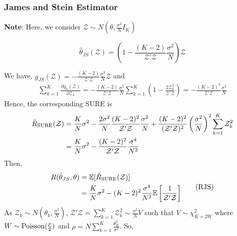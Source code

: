 \documentclass[11pt]{elegantbook}
\begin{document}
\subsubsection{James and Stein Estimator}
\textbf{Note}: Here, we consider $\mathcal{Z}\sim N(\theta,\frac{\sigma^2}{N}I_K)$
\begin{theorem}
    $$\hat{\theta}_{JS}(\mathcal{Z})=\left(1-\frac{(K-2)}{\mathcal{Z}'\mathcal{Z}}\frac{\sigma^2}{N}\right)\mathcal{Z}$$
\end{theorem}
We have, $g_{JS}(\mathcal{Z})=-\frac{(K-2)}{\mathcal{Z}'\mathcal{Z}}\frac{\sigma^2}{N}\mathcal{Z}$ and
\begin{equation}
    \begin{aligned}
        \sum_{k=1}^K \frac{\partial g_k(\mathcal{Z})}{\partial \mathcal{Z}_k}=-\frac{(K-2)}{\mathcal{Z}'\mathcal{Z}}\frac{\sigma^2}{N}\sum_{k=1}^K\left(1-\frac{2 \mathcal{Z}_k^2}{\mathcal{Z}'\mathcal{Z}}\right)=-\frac{(K-2)^2}{\mathcal{Z}'\mathcal{Z}}\frac{\sigma^2}{N}
    \end{aligned}
    \nonumber
\end{equation}
Hence, the corresponding SURE is
\begin{equation}
    \begin{aligned}
        \hat{R}_\textnormal{SURE}(\mathcal{Z})&=\frac{K}{N}\sigma^2-\frac{2\sigma^2}{N}\frac{(K-2)^2}{\mathcal{Z}'\mathcal{Z}}\frac{\sigma^2}{N}+\frac{(K-2)^2}{(\mathcal{Z}'\mathcal{Z})^2}\left(\frac{\sigma^2}{N}\right)^2\sum_{k=1}^K \mathcal{Z}_k^2\\
        &=\frac{K}{N}\sigma^2-\frac{(K-2)^2}{\mathcal{Z}'\mathcal{Z}}\frac{\sigma^4}{N^2}
    \end{aligned}
    \nonumber
\end{equation}
Then,
\begin{equation}
    \begin{aligned}
        R(\hat{\theta}_{JS},\theta)&=\mathbb{E}[\hat{R}_\textnormal{SURE}(\mathcal{Z})]\\
        &=\frac{K}{N}\sigma^2-(K-2)^2\frac{\sigma^4}{N^2}\mathbb{E}\left[\frac{1}{\mathcal{Z}'\mathcal{Z}}\right]
    \end{aligned}
    \tag{RJS}
    \label{RJS}
\end{equation}
As $\mathcal{Z}_k\sim N(\theta_k,\frac{\sigma^2}{N})$, $\mathcal{Z}'\mathcal{Z}=\sum_{k=1}^K \mathcal{Z}_k^2\sim \frac{\sigma^2}{N}V$ such that $V\sim \chi^2_{K+2W}$ where $W\sim \textnormal{Poisson}(\frac{\rho}{2})$ and $\rho=N\sum_{k=1}^K \frac{\theta_K^2}{\sigma^2}$. So,
\end{document}
